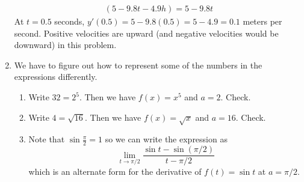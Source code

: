 \documentclass{article}
\newcommand{\ds}{\displaystyle}
\begin{document}
\begin{enumerate}
\begin{align*}
         (5-9.8t-4.9h) = 5-9.8t
  \end{align*}
  At $t=0.5$ seconds, $y'(0.5) = 5-9.8(0.5) = 5-4.9 = 0.1$ meters per
  second.  Positive velocities are upward (and negative velocities
  would be downward) in this problem.
\item %
  We have to figure out how to represent some of the numbers in the
  expressions differently.
  \begin{enumerate}
  \item Write $32=2^5$.  Then we have $f(x)=x^5$ and $a=2$.  Check.
  \item Write $4=\sqrt{16}$.  Then we have $f(x)=\sqrt{x}$ and
    $a=16$.  Check.
  \item Note that $\ds \sin \frac{\pi}{2} = 1$ so we can write the
    expression as
    \begin{displaymath}
      \lim_{t\to\pi/2} \frac{\sin t - \sin(\pi/2)}{t-\pi/2}
    \end{displaymath}
    which is an alternate form for the derivative of $f(t)=\sin t$ at
    $a=\pi/2$.
    

\end{enumerate}
\end{enumerate}
\end{document}
